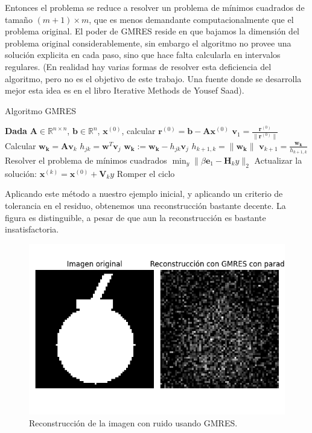 \documentclass[12pt, oneside]{book}
\begin{document}
	Entonces el problema se reduce a resolver un problema de mínimos cuadrados de tamaño $(m+1)\times m$, que es menos demandante computacionalmente que el problema original. El poder de GMRES reside en que bajamos la dimensión del problema original considerablemente, sin embargo el algoritmo no provee una solución explicita en cada paso, sino que hace falta calcularla en intervalos regulares. (En realidad hay varias formas de resolver esta deficiencia del algoritmo, pero no es el objetivo de este trabajo. Una fuente donde se desarrolla mejor esta idea es en el libro Iterative Methods de Yousef Saad).
	
	\begin{algorithm}
		\caption{Algoritmo GMRES}
		\begin{algorithmic}[1]
			\STATE \textbf{Dada} $\mathbf{A} \in \mathbb{R}^{n \times n}$, $\mathbf{b} \in \mathbb{R}^n$, $\mathbf{x}^{(0)}$, calcular $\mathbf{r}^{(0)} = \mathbf{b} - \mathbf{A} \mathbf{x}^{(0)}$
			\STATE $\mathbf{v}_1 = \frac{\mathbf{r}^{(0)}}{\|\mathbf{r}^{(0)}\|}$
			\STATE Calcular $\mathbf{w_k} = \mathbf{A} \mathbf{v}_k$
			\STATE $h_{jk} = \mathbf{w}^T \mathbf{v}_j$
			\STATE $\mathbf{w_k} := \mathbf{w_k} - h_{jk} \mathbf{v}_j$
			\ENDFOR
			\STATE $h_{k+1,k} = \|\mathbf{w_k}\|$
			\STATE $\mathbf{v}_{k+1} = \frac{\mathbf{w_k}}{h_{k+1,k}}$
			\ENDIF
			\ENDFOR
			\STATE Resolver el problema de mínimos cuadrados $\min_y \|\beta \mathbf{e}_1 - \mathbf{H}_k y\|_2$
			\STATE Actualizar la solución: $\mathbf{x}^{(k)} = \mathbf{x}^{(0)} + \mathbf{V}_k y$
			\STATE Romper el ciclo
			\ENDIF
		\end{algorithmic}
	\end{algorithm}
	
	Aplicando este método a nuestro ejemplo inicial, y aplicando un criterio de tolerancia en el residuo, obtenemos una reconstrucción bastante decente. La figura es distinguible, a pesar de que aun la reconstrucción es bastante insatisfactoria.
	\begin{figure}[H]
		\centering
		\includegraphics[scale=0.5]{Imagenes/mate_GMRES.png}
		\caption{Reconstrucción de la imagen con ruido usando GMRES.\\}
	\end{figure}
\end{document}

